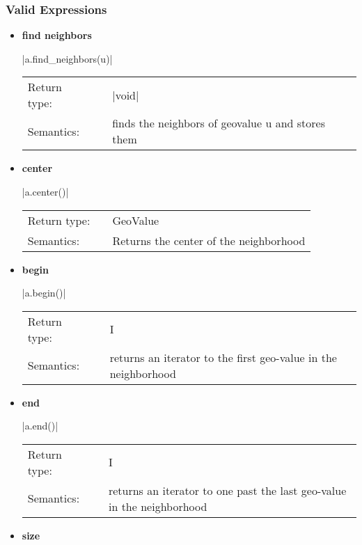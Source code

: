 \documentclass[12pt,twoside]{report}
\begin{document}
\htmlrule[CLEAR=all]  \subsubsection*{Valid Expressions}

\begin{itemize}

\item {\bf find neighbors}

  |a.find_neighbors(u)|

  \begin{tabular}[!h]{l p{1cm} p{10cm}}
    Return type: & & |void|\\
    Semantics: & & finds the neighbors of geovalue u and stores them\\
  \end{tabular}

\item {\bf center}

  |a.center()|

  \begin{tabular}[!h]{l p{1cm} p{10cm}}
    Return type: & & GeoValue\\
    Semantics: & & Returns the center of the neighborhood\\
  \end{tabular}

\item {\bf begin}

  |a.begin()|

  \begin{tabular}[!h]{l p{1cm} p{10cm}}
    Return type: & & I\\
    Semantics: & & returns an iterator to the first geo-value in the neighborhood\\
  \end{tabular}



 \item {\bf end}

  |a.end()|

  \begin{tabular}[!h]{l p{1cm} p{10cm}}
    Return type: & & I\\
    Semantics: & & returns an iterator to one past the last geo-value in the neighborhood\\
  \end{tabular}



 \item {\bf size}


\end{itemize}
\end{document}
